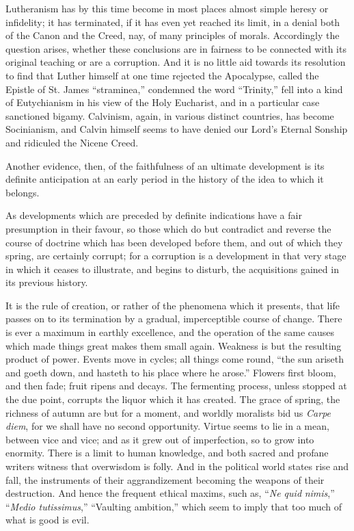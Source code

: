 Lutheranism has by this time become in most places
almost simple heresy or infidelity; it has terminated, if
it has even yet reached its limit, in a denial both of
the Canon and the Creed, nay, of many principles of
morals. Accordingly the question arises, whether these
conclusions are in fairness to be connected with its
original teaching or are a corruption. And it is no
little aid towards its resolution to find that Luther
himself at one time rejected the Apocalypse, called the
Epistle of St. James ``straminea,'' condemned
the word ``Trinity,'' fell into a kind of
Eutychianism in his view of the Holy Eucharist, and in a
particular case sanctioned bigamy. Calvinism, again, in
various distinct countries, has become Socinianism, and
Calvin himself seems to have denied our Lord's Eternal
Sonship and ridiculed the Nicene Creed.

Another evidence, then, of the faithfulness of an
ultimate development is its definite anticipation at an
early period in the history of the idea to which it
belongs.


As developments which are preceded by definite
indications have a fair presumption in their favour, so
those which do but contradict and reverse the course of
doctrine which has been developed before them, and out of
which they spring, are certainly corrupt; for a
corruption is a development in that very stage in which
it ceases to illustrate, and begins to disturb, the
acquisitions gained in its previous history.

It is the rule of creation, or rather of the phenomena
which it presents, that life passes on to its termination
by a gradual, imperceptible course of change. There is
ever a maximum in earthly excellence, and the operation
of the same causes which made things great makes them
small again. Weakness is but the resulting product of
power. Events move in cycles; all things come round,
``the sun ariseth and goeth down, and hasteth to his
place where he arose.'' Flowers first bloom, and then
fade; fruit ripens and decays. The fermenting process,
unless stopped at the due point, corrupts the liquor
which it has created. The grace of spring, the richness
of autumn are but for a moment, and worldly moralists bid
us \emph{Carpe diem}, for we shall have no second
opportunity. Virtue seems to lie in a mean, between vice
and vice; and as it grew out of imperfection, so to grow
into enormity. There is a limit to human knowledge, and
both sacred and profane writers witness that overwisdom
is folly. And in the political world states rise and
fall, the instruments of their aggrandizement becoming
the weapons of their destruction. And hence the frequent
ethical maxims, such as, ``\emph{Ne quid }\emph{ nimis},''
``\emph{Medio tutissimus},'' ``Vaulting
ambition,'' which seem to imply that too much of what
is good is evil.

